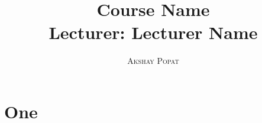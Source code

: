 \documentclass[a4paper,11pt]{article}
\title{\Huge \textbf{Course Name}   \\ \huge Lecturer: Lecturer Name }
\author{
    \textsc{Akshay Popat}
}
\begin{document}
    \maketitle
    
    \tableofcontents
    
    \section{One}


    \nocite{*}
    \printbibliography
\end{document}
